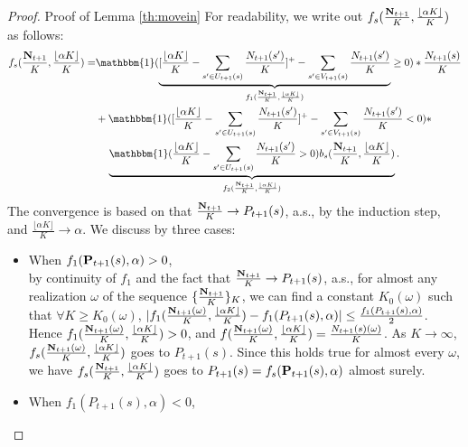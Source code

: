 \section{}\label{ap:movein}
\begin{proof}{Proof of Lemma \ref{th:movein}}
For readability, we write out $f_s(\frac{\mathbf{N}_{t+1}}{K},\frac{\lfloor\alpha K\rfloor}{K})$ as follows:
\begin{align}
f_s(\frac{\Nv_{t+1}}{K},\frac{\lfloor\alpha K\rfloor}{K}) =& \mathbbm{1}(\underbrace{[\frac{\lfloor\alpha K\rfloor}{K}-\sum_{s'\in U_{t+1}(s)}\frac{N_{t+1}(s')}{K}]^+ - \sum_{s'\in V_{t+1}(s)}\frac{N_{t+1}(s')}{K}}_{f_1(\frac{\Nv_{t+1}}{K},\frac{\lfloor\alpha K\rfloor}{K})}\geq 0)
*\frac{N_{t+1}(s)}{K} \nonumber\\
&+\mathbbm{1}([\frac{\lfloor\alpha K\rfloor}{K}-\sum_{s'\in U_{t+1}(s)}\frac{N_{t+1}(s')}{K}]^+ -\sum_{s'\in V_{t+1}(s)}\frac{N_{t+1}(s')}{K}<0)*\nonumber\\
&\hspace{4mm}\underbrace{\mathbbm{1}(\frac{\lfloor\alpha K\rfloor}{K}-\sum_{s'\in U_{t+1}(s)}\frac{N_{t+1}(s')}{K}>0)b_s(\frac{\Nv_{t+1}}{K},\frac{\lfloor\alpha K\rfloor}{K})}_{f_2(\frac{\Nv_{t+1}}{K},\frac{\lfloor\alpha K\rfloor}{K})}.
\end{align}
The convergence is based on that $\frac{\mathbf{N}_{t+1}}{K} \rightarrow P_{t+1}(s)$, a.s., by the induction step, and $\frac{\lfloor\alpha K\rfloor}{K}\rightarrow \alpha$.
We discuss by three cases:
\begin{itemize}
\item When $f_1(\mathbf{P}_{t+1}(s),\alpha)>0$,\\
by continuity of $f_1$ and the fact that $\frac{\mathbf{N}_{t+1}}{K} \rightarrow P_{t+1}(s)$, a.s., for almost any realization $\omega$ of the sequence $\{\frac{\mathbf{N}_{t+1}}{K}\}_K$, we can find a constant $K_0(\omega)$ such that $\forall K \geq K_0(\omega)$, $|f_1(\frac{\mathbf{N}_{t+1}(\omega)}{K},\frac{\lfloor\alpha K\rfloor}{K})-f_1(P_{t+1}(s),\alpha)|\leq \frac{f_1(P_{t+1}(s),\alpha)}{2}$.  
Hence $f_1(\frac{\mathbf{N}_{t+1}(\omega)}{K},\frac{\lfloor\alpha K\rfloor}{K}) > 0$, and $f(\frac{\mathbf{N}_{t+1}(\omega)}{K},\frac{\lfloor\alpha K\rfloor}{K}) = \frac{N_{t+1}(s)(\omega)}{K}$. As $K\rightarrow\infty$, $f_s(\frac{\mathbf{N}_{t+1}(\omega)}{K},\frac{\lfloor\alpha K\rfloor}{K})$ goes to $P_{t+1}(s)$. Since this holds true for almost every $\omega$, we have $f_s(\frac{\mathbf{N}_{t+1}}{K},\frac{\lfloor\alpha K\rfloor}{K})$ goes to $P_{t+1}(s) = f_s(\mathbf{P}_{t+1}(s),\alpha)$ almost surely. 
\item When $f_1(P_{t+1}(s),\alpha)<0$,\\

\end{itemize}
\end{proof}
